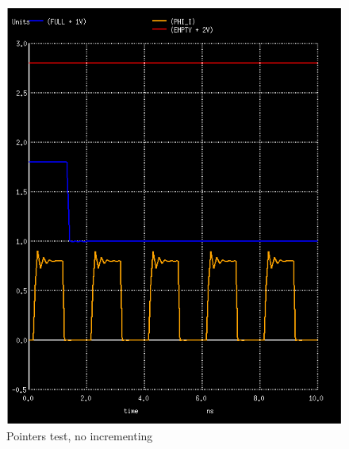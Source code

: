 \documentclass[12pt]{report}
\begin{document}
\begin{figure}[H]
  \centering
    \includegraphics[width=1.0\textwidth]{pointers_test_do_nothing.PNG}
  \caption{Pointers test, no incrementing}
  \label{fig:pointers_test_do_nothing}
\end{figure}
\end{document}
